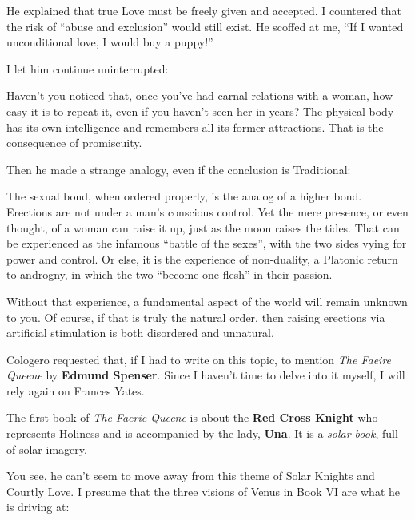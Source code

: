 He explained that true Love must be freely given and accepted. I countered that the risk of ``abuse and exclusion'' would still exist. He scoffed at me, ``If I wanted unconditional love, I would buy a puppy!''

I let him continue uninterrupted:

\begin{quotex}
Haven't you noticed that, once you've had carnal relations with a woman, how easy it is to repeat it, even if you haven't seen her in years? The physical body has its own intelligence and remembers all its former attractions. That is the consequence of promiscuity.
\end{quotex}


Then he made a strange analogy, even if the conclusion is Traditional:

\begin{quotex}
The sexual bond, when ordered properly, is the analog of a higher bond. Erections are not under a man's conscious control. Yet the mere presence, or even thought, of a woman can raise it up, just as the moon raises the tides. That can be experienced as the infamous ``battle of the sexes'', with the two sides vying for power and control. Or else, it is the experience of non-duality, a Platonic return to androgny, in which the two ``become one flesh'' in their passion.

Without that experience, a fundamental aspect of the world will remain unknown to you. Of course, if that is truly the natural order, then raising erections via artificial stimulation is both disordered and unnatural.
\end{quotex}


Cologero requested that, if I had to write on this topic, to mention \emph{The Faeire Queene} by \textbf{Edmund Spenser}. Since I haven't time to delve into it myself, I will rely again on Frances Yates.

The first book of \emph{The Faerie Queene} is about the \textbf{Red Cross Knight} who represents Holiness and is accompanied by the lady, \textbf{Una}. It is a \emph{solar book}, full of solar imagery.

You see, he can't seem to move away from this theme of Solar Knights and Courtly Love. I presume that the three visions of Venus in Book VI are what he is driving at:

